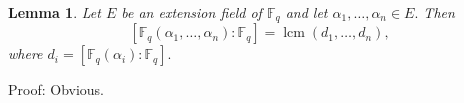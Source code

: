 \documentclass[11pt,onecolumn]{IEEEtran}
\newtheorem{lemma}{Lemma}
\newcommand{\ff}{{\mathbb F}}
\DeclareMathOperator{\lcm}{lcm}
\begin{document}
\begin{lemma}\label{lem2} Let $E$ be an extension field of  $\ff_q$ and let $\alpha_1,\dots,\alpha_n\in E.$ Then
$$[\ff_q(\alpha_1,\dots,\alpha_n):\ff_q]=\lcm(d_1,\dots,d_n),$$
where $d_i=[\ff_q(\alpha_i):\ff_q].$
\end{lemma}
Proof: Obvious.
\end{document}
